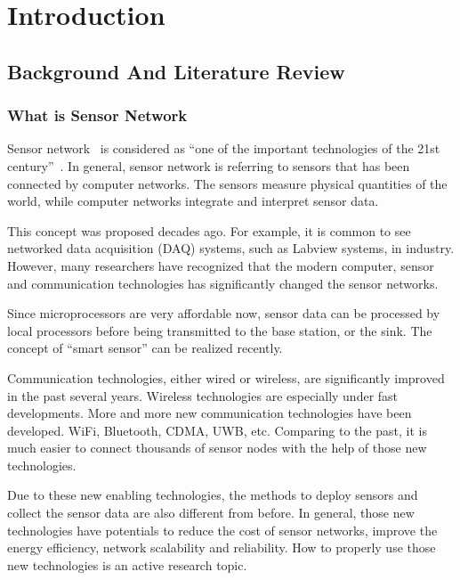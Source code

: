 \chapter{Introduction}\label{s:intro}
\section{Background And Literature Review}
\subsection{What is Sensor Network}
Sensor network~\cite{AkyildizSurveySN} is considered as ``one of the important technologies of the 21st century''~\cite{ChongSensornet}. In general, sensor network is referring to sensors that has been connected by computer networks. The sensors measure physical quantities of the world, while computer networks integrate and interpret sensor data.

This concept was proposed decades ago. For example, it is common to see networked data acquisition (DAQ) systems, such as Labview systems\cite{labview}, in industry. However, many researchers have recognized that the modern computer, sensor and communication technologies has significantly changed the sensor networks.

Since microprocessors are very affordable now, sensor data can be processed by local processors before being transmitted to the base station, or the sink. The concept of ``smart sensor'' can be realized recently.


Communication technologies, either wired or wireless, are significantly improved in the past several years. Wireless technologies are especially under fast developments. %
More and more new communication technologies have been developed. WiFi, Bluetooth, CDMA, UWB, etc. Comparing to the past, it is much easier to connect thousands of sensor nodes with the help of those new technologies.


     Due to these new enabling technologies, the methods to deploy sensors and collect the sensor data are also different from before. In general, those new technologies have potentials to reduce the cost of sensor networks, improve the energy efficiency, network scalability and reliability. How to properly use those new technologies is an active research topic.

